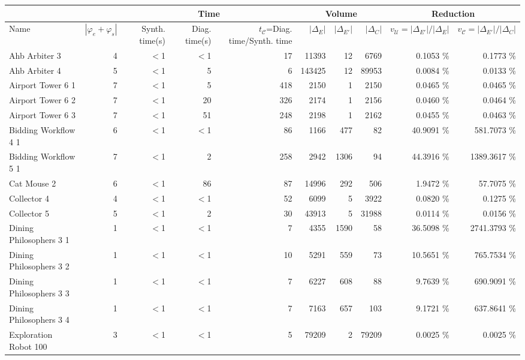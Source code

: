 \begin{tabular}{|l|r|rrr|rrr|rr|}
  \hline & & \multicolumn{3}{c|}{Time}&\multicolumn{3}{c|}{Volume} & \multicolumn{2}{c|}{Reduction}\\ \hline
Name & $|\varphi_e + \varphi_s|$ & Synth. time(s) & Diag. time(s) & $t_{\mathcal{C}}$=Diag. time/Synth. time & $|\Delta_E|$ & $|\Delta_{E'}|$ & $|\Delta_{C}|$ & $v_{\mathcal{U}}=|\Delta_{E'}|/|\Delta_{E}|$ & $v_{\mathcal{C}}=|\Delta_{E'}|/|\Delta_{C}|$ \\ 
  \hline
Ahb Arbiter 3 &   4 & $<$1 & $<$1 & 17 & 11393 & 12 & 6769 &  0.1053 \% &    0.1773 \% \\ 
  Ahb Arbiter 4 &   5 & $<$1 & 5 & 6 & 143425 & 12 & 89953 &  0.0084 \% &    0.0133 \% \\ 
  Airport Tower 6 1 &   7 & $<$1 & 5 & 418 & 2150 & 1 & 2150 &  0.0465 \% &    0.0465 \% \\ 
  Airport Tower 6 2 &   7 & $<$1 & 20 & 326 & 2174 & 1 & 2156 &  0.0460 \% &    0.0464 \% \\ 
  Airport Tower 6 3 &   7 & $<$1 & 51 & 248 & 2198 & 1 & 2162 &  0.0455 \% &    0.0463 \% \\ 
  Bidding Workflow 4 1 &   6 & $<$1 & $<$1 & 86 & 1166 & 477 &  82 & 40.9091 \% &  581.7073 \% \\ 
  Bidding Workflow 5 1 &   7 & $<$1 & 2 & 258 & 2942 & 1306 &  94 & 44.3916 \% & 1389.3617 \% \\ 
  Cat Mouse 2 &   6 & $<$1 & 86 & 87 & 14996 & 292 & 506 &  1.9472 \% &   57.7075 \% \\ 
  Collector 4 &   4 & $<$1 & $<$1 & 52 & 6099 & 5 & 3922 &  0.0820 \% &    0.1275 \% \\ 
  Collector 5 &   5 & $<$1 & 2 & 30 & 43913 & 5 & 31988 &  0.0114 \% &    0.0156 \% \\ 
  Dining Philosophers 3 1 &   1 & $<$1 & $<$1 & 7 & 4355 & 1590 &  58 & 36.5098 \% & 2741.3793 \% \\ 
  Dining Philosophers 3 2 &   1 & $<$1 & $<$1 & 10 & 5291 & 559 &  73 & 10.5651 \% &  765.7534 \% \\ 
  Dining Philosophers 3 3 &   1 & $<$1 & $<$1 & 7 & 6227 & 608 &  88 &  9.7639 \% &  690.9091 \% \\ 
  Dining Philosophers 3 4 &   1 & $<$1 & $<$1 & 7 & 7163 & 657 & 103 &  9.1721 \% &  637.8641 \% \\ 
  Exploration Robot 100 &   3 & $<$1 & $<$1 & 5 & 79209 & 2 & 79209 &  0.0025 \% &    0.0025 \% \\ 

\end{tabular}
